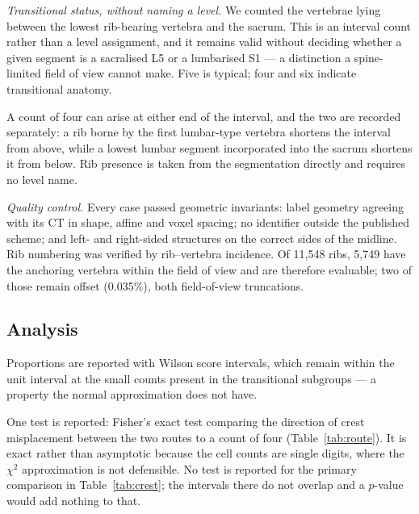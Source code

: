 \documentclass[11pt,a4paper]{article}
\begin{document}
\emph{Transitional status, without naming a level.} We counted the vertebrae lying
between the lowest rib-bearing vertebra and the sacrum. This is an interval count rather
than a level assignment, and it remains valid without deciding whether a given segment is
a sacralised L5 or a lumbarised S1 --- a distinction a spine-limited field of view cannot
make. Five is typical; four and six indicate transitional anatomy.

A count of four can arise at either end of the interval, and the two are recorded
separately: a rib borne by the first lumbar-type vertebra shortens the interval from
above, while a lowest lumbar segment incorporated into the sacrum shortens it from below.
Rib presence is taken from the segmentation directly and requires no level name.

\emph{Quality control.} Every case passed geometric invariants: label geometry agreeing
with its CT in shape, affine and voxel spacing; no identifier outside the published
scheme; and left- and right-sided structures on the correct sides of the midline. Rib
numbering was verified by rib--vertebra incidence. Of 11{,}548 ribs, 5{,}749 have the
anchoring vertebra within the field of view and are therefore evaluable; two of those
remain offset (0.035\%), both field-of-view truncations.

\subsection{Analysis}

Proportions are reported with Wilson score intervals, which remain within the unit
interval at the small counts present in the transitional subgroups --- a property the
normal approximation does not have.

One test is reported: Fisher's exact test comparing the direction of crest misplacement
between the two routes to a count of four (Table~\ref{tab:route}). It is exact rather
than asymptotic because the cell counts are single digits, where the $\chi^2$
approximation is not defensible. No test is reported for the primary comparison in
Table~\ref{tab:crest}; the intervals there do not overlap and a $p$-value would add
nothing to that.

\end{document}
